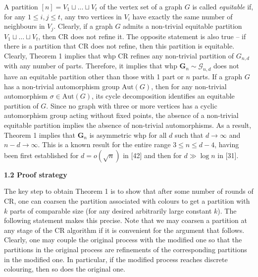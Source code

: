 \documentclass[10pt,a4paper]{article}
\begin{document}
A partition $[n]=V_{1}\sqcup\ldots\sqcup V_{t}$ of the vertex set of a graph $G$ is called \emph{equitable} if, for any $1\leq i,j\leq t$, any two vertices in $V_{i}$ have exactly the same number of neighbours in $V_{j}$. Clearly, if a graph $G$ admits a non-trivial equitable partition $V_{1}\sqcup\ldots\sqcup V_{t}$, then CR does not refine it. The opposite statement is also true – if there is a partition that CR does not refine, then this partition is equitable. Clearly, Theorem 1 implies that whp CR refines any non-trivial partition of $G_{n,d}$ with any number of parts. Therefore, it implies that whp $\mathbf{G}_{n}\sim\mathcal{G}_{n,d}$ does not have an equitable partition other than those with 1 part or $n$ parts. If a graph $G$ has a non-trivial automorphism group $\mathrm{Aut}(G)$, then for any non-trivial automorphism $\sigma\in\mathrm{Aut}(G)$, its cycle decomposition identifies an equitable partition of $G$.
Since no graph with three or more vertices has a
cyclic automorphism group acting without fixed points,
the absence of a non-trivial equitable partition implies
the absence of non-trivial automorphisms.
As a result, Theorem 1 implies that $\mathbf{G}_{n}$ is asymmetric whp for all $d$ such that $d\to\infty$ and $n-d\to\infty$. This is a known result for the entire range $3\leq n\leq d-4$, having been first established for $d=o(\sqrt{n})$ in [42] and then for $d\gg\log n$ in [31].\par





\par\medskip\noindent\textbf{
1.2 Proof strategy}\par




The key step to obtain Theorem 1 is to show that after some number of rounds of CR, one can coarsen the partition associated with colours to get a partition with $k$ parts of comparable size (for any desired arbitrarily large constant $k$). The following statement makes this precise.
Note that we may coarsen a partition at any stage of the CR algorithm if it is convenient for the argument that follows. Clearly, one may couple the original process with the modified one so that the partitions in the original process are refinements of the corresponding partitions in the modified one. In particular, if the modified process reaches discrete colouring, then so does the original one.\par
\end{document}
